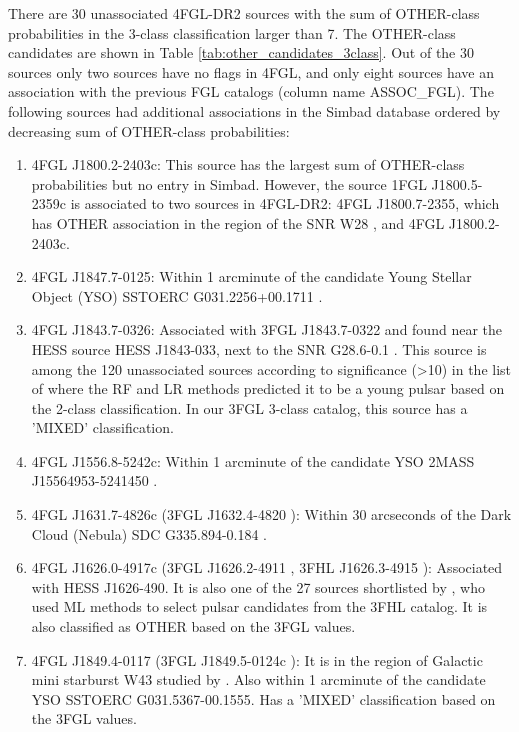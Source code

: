 \documentclass{aa}
\begin{document}
There are 30 unassociated 4FGL-DR2 sources
with the sum of OTHER-class probabilities in the 3-class classification larger than 7.
The OTHER-class candidates are shown in Table \ref{tab:other_candidates_3class}.
Out of the 30 sources only two sources have no flags in 4FGL, and only eight sources have an association with the previous FGL catalogs (column name ASSOC\_FGL). 
The following sources had additional associations in the Simbad database
ordered by decreasing sum of OTHER-class probabilities:
\begin{enumerate}
\item 4FGL J1800.2-2403c: This source has the largest sum of OTHER-class probabilities but no entry in Simbad. 
However, the source 1FGL J1800.5-2359c \citep{2010ApJS..188..405A} is associated to two sources in 4FGL-DR2:
4FGL J1800.7-2355, which has OTHER association in the region of the SNR W28 \citep{2020MNRAS.495.2909R}, and 4FGL J1800.2-2403c.
\item 4FGL J1847.7-0125: Within 1 arcminute of the candidate Young Stellar Object (YSO) SSTOERC G031.2256+00.1711 \citep{2017ApJ...839..108S}.
\item 4FGL J1843.7-0326: Associated with 3FGL J1843.7-0322 and found near the HESS source HESS J1843-033, next to the SNR G28.6-0.1 \citep{2018A&A...612A...1H}. This source is
among the 120 unassociated sources according to significance (>10) in the list of \citet{2016ApJ...820....8S} where the RF and LR methods predicted it to be a young pulsar based on the 2-class classification. 
In our 3FGL 3-class catalog, this source has a 'MIXED' classification.
\item 4FGL J1556.8-5242c: Within 1 arcminute of the candidate YSO 2MASS J15564953-5241450 \citep{2008AJ....136.2413R}.
\item 4FGL J1631.7-4826c (3FGL J1632.4-4820 \citep{2015ApJS..218...23A}): Within 30 arcseconds of the Dark Cloud (Nebula) SDC G335.894-0.184 \citep{2016A&A...590A..72P}.
\item 4FGL J1626.0-4917c (3FGL J1626.2-4911 \citep{2015ApJS..218...23A}, 3FHL J1626.3-4915 \citep{2017ApJS..232...18A}): 
Associated with HESS J1626-490. It is also one of the 27 sources shortlisted by \citet{2020MNRAS.495.1093H}, 
who used ML methods to select pulsar candidates from the 3FHL catalog. It is also classified as OTHER based on the 3FGL values.
\item 4FGL J1849.4-0117 (3FGL J1849.5-0124c \citep{2015ApJS..218...23A}): It is in the region of Galactic mini starburst W43 studied by \citet{2020A&A...640A..60Y}. Also within 1 arcminute of the candidate YSO SSTOERC G031.5367-00.1555. Has a 'MIXED' classification based on the 3FGL values.

\end{enumerate}
\end{document}
